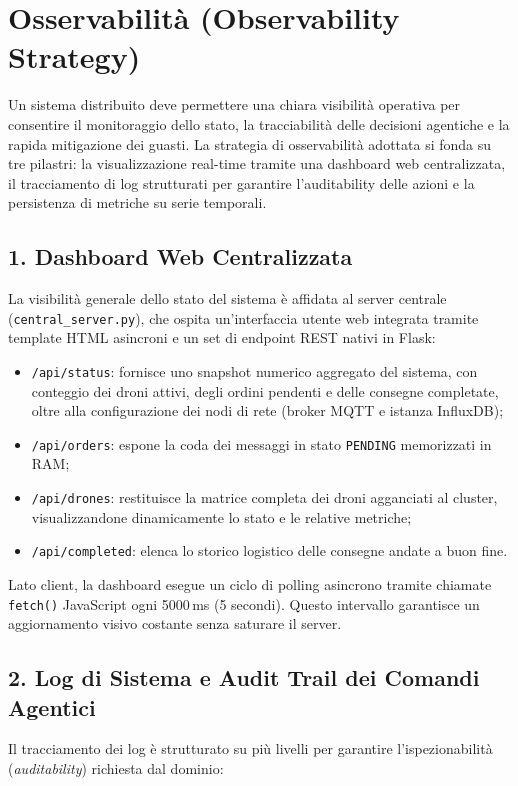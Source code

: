 \section{Osservabilità (Observability Strategy)}
\label{sec:osservabilita}

Un sistema distribuito deve permettere una chiara visibilità operativa per consentire il monitoraggio dello stato, la tracciabilità delle decisioni agentiche e la rapida mitigazione dei guasti. La strategia di osservabilità adottata si fonda su tre pilastri: la visualizzazione real-time tramite una dashboard web centralizzata, il tracciamento di log strutturati per garantire l'auditability delle azioni e la persistenza di metriche su serie temporali.

\subsection*{1. Dashboard Web Centralizzata}
La visibilità generale dello stato del sistema è affidata al server centrale (\texttt{central\_server.py}), che ospita un'interfaccia utente web integrata tramite template HTML asincroni e un set di endpoint REST nativi in Flask:

\begin{itemize}
    \item \texttt{/api/status}: fornisce uno snapshot numerico aggregato del sistema, con conteggio dei droni attivi, degli ordini pendenti e delle consegne completate, oltre alla configurazione dei nodi di rete (broker MQTT e istanza InfluxDB);
    \item \texttt{/api/orders}: espone la coda dei messaggi in stato \texttt{PENDING} memorizzati in RAM;
    \item \texttt{/api/drones}: restituisce la matrice completa dei droni agganciati al cluster, visualizzandone dinamicamente lo stato e le relative metriche;
    \item \texttt{/api/completed}: elenca lo storico logistico delle consegne andate a buon fine.
\end{itemize}

Lato client, la dashboard esegue un ciclo di polling asincrono tramite chiamate \texttt{fetch()} JavaScript ogni 5000\,ms (5 secondi). Questo intervallo garantisce un aggiornamento visivo costante senza saturare il server.

\subsection*{2. Log di Sistema e Audit Trail dei Comandi Agentici}
Il tracciamento dei log è strutturato su più livelli per garantire l'ispezionabilità (\textit{auditability}) richiesta dal dominio:

